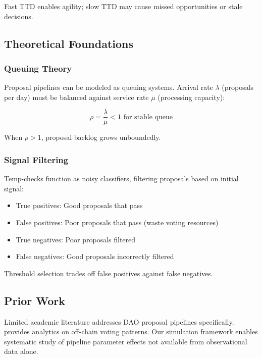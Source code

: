Fast TTD enables agility; slow TTD may cause missed opportunities or stale decisions.

\subsection{Theoretical Foundations}

\subsubsection{Queuing Theory}

Proposal pipelines can be modeled as queuing systems. Arrival rate $\lambda$ (proposals per day) must be balanced against service rate $\mu$ (processing capacity):

\begin{equation}
\rho = \frac{\lambda}{\mu} < 1 \text{ for stable queue}
\end{equation}

When $\rho > 1$, proposal backlog grows unboundedly.

\subsubsection{Signal Filtering}

Temp-checks function as noisy classifiers, filtering proposals based on initial signal:
\begin{itemize}
    \item True positives: Good proposals that pass
    \item False positives: Poor proposals that pass (waste voting resources)
    \item True negatives: Poor proposals filtered
    \item False negatives: Good proposals incorrectly filtered
\end{itemize}

Threshold selection trades off false positives against false negatives.

\subsection{Prior Work}

Limited academic literature addresses DAO proposal pipelines specifically. \citet{snapshot2021governance} provides analytics on off-chain voting patterns. Our simulation framework enables systematic study of pipeline parameter effects not available from observational data alone.
